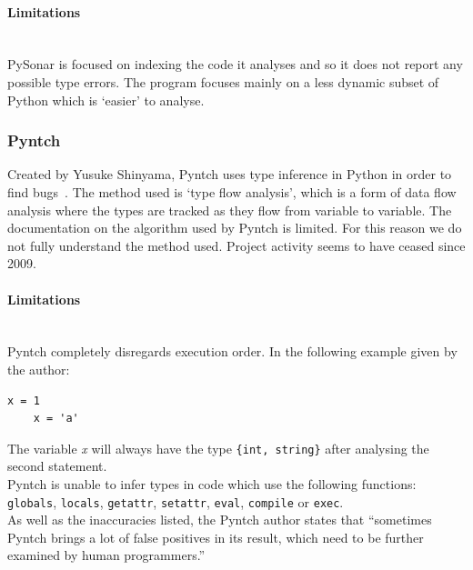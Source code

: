 \documentclass[12pt, titlepage]{article}
\begin{document}
\paragraph{Limitations}\mbox{}\\
PySonar is focused on indexing the code it analyses and so it does not report any possible type errors. The program focuses mainly on a less dynamic subset of Python which is `easier' to analyse.

\subsubsection{Pyntch}
Created by Yusuke Shinyama, Pyntch uses type inference in Python in order to find bugs~\cite{pyntch}. The method used is `type flow analysis', which is a form of data flow analysis where the types are tracked as they flow from variable to variable. The documentation on the algorithm used by Pyntch is limited. For this reason we do not fully understand the method used. Project activity seems to have ceased since 2009.
\paragraph{Limitations}\mbox{}\\
Pyntch completely disregards execution order. In the following example given by the author:
\begin{lstlisting}[mathescape]
    x = 1
    x = 'a'
\end{lstlisting}
The variable \textit{x} will always have the type \texttt{\{int, string\}} after analysing the second statement. \\
\indent Pyntch is unable to infer types in code which use the following functions: \texttt{globals},  \texttt{locals},  \texttt{getattr},  \texttt{setattr},  \texttt{eval},  \texttt{compile} or  \texttt{exec}. \\
\indent As well as the inaccuracies listed, the Pyntch author states that ``sometimes Pyntch brings a lot of false positives in its result, which need to be further examined by human programmers.''

\end{document}
